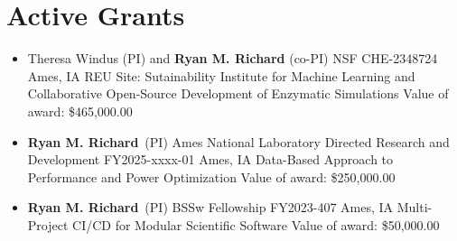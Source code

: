 \documentclass[11pt,a4paper,sans]{moderncv}
\begin{document}
\section{Active Grants}
\vspace{5pt}
\begin{itemize}
	\item{
		{Theresa Windus (PI) and \textbf{Ryan M. Richard} (co-PI)}
		{NSF CHE-2348724}
		{Ames, IA}
		{}
		{REU Site: Sutainability Institute for Machine Learning and 
		 Collaborative Open-Source Development of Enzymatic Simulations}
		{Value of award: \$465,000.00}
		{}
	}

	\item{
		{\textbf{Ryan M. Richard}\ (PI)}
		{Ames National Laboratory Directed Research and Development
         FY2025-xxxx-01}
		{Ames, IA}
		{}
		{Data-Based Approach to Performance and Power Optimization}
		{Value of award: \$250,000.00}
		{}
	}
	\item{
		{\textbf{Ryan M. Richard}\ (PI)}
		{BSSw Fellowship FY2023-407}
		{Ames, IA}
		{}
		{Multi-Project CI/CD for Modular Scientific Software}
		{Value of award: \$50,000.00}
		{}
	}
\end{itemize}
\end{document}
